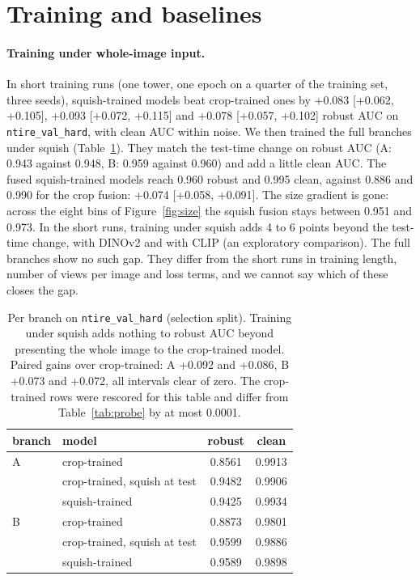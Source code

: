 \documentclass[letterpaper]{article} %
\begin{document}
\section{Training and baselines}
\label{sec:training}

\paragraph{Training under whole-image input.} In short training runs (one tower,
one epoch on a quarter of the training set, three seeds), squish-trained
models beat crop-trained ones by +0.083 [+0.062, +0.105], +0.093 [+0.072,
+0.115] and +0.078 [+0.057, +0.102] robust AUC on \texttt{ntire\_val\_hard},
with clean AUC within noise. We then trained the full branches under squish
(Table~\ref{tab:branches}). They match the test-time change on robust AUC (A:
0.943 against 0.948, B: 0.959 against 0.960) and add a little clean AUC. The
fused squish-trained models reach 0.960 robust and 0.995 clean, against 0.886
and 0.990 for the crop fusion: +0.074 [+0.058, +0.091]. The size gradient is
gone: across the eight bins of Figure~\ref{fig:size} the squish fusion stays
between 0.951 and 0.973. In the short runs, training under squish adds 4 to 6
points beyond the test-time change, with DINOv2 and with CLIP (an
exploratory comparison). The full branches show no such gap. They
differ from the short runs in training length, number of views per image and
loss terms, and we cannot say which of these closes the gap.

\begin{table}[t]
\centering
\small
\setlength{\tabcolsep}{4pt}
\begin{tabular}{llcc}
\toprule
branch & model & robust & clean \\
\midrule
A & crop-trained & 0.8561 & 0.9913 \\
  & crop-trained, squish at test & 0.9482 & 0.9906 \\
  & squish-trained & 0.9425 & 0.9934 \\
\midrule
B & crop-trained & 0.8873 & 0.9801 \\
  & crop-trained, squish at test & 0.9599 & 0.9886 \\
  & squish-trained & 0.9589 & 0.9898 \\
\bottomrule
\end{tabular}
\caption{Per branch on \texttt{ntire\_val\_hard} (selection split). Training under
squish adds nothing to robust AUC beyond presenting the whole image to the
crop-trained model. Paired gains over crop-trained: A +0.092 and +0.086, B
+0.073 and +0.072, all intervals clear of zero. The crop-trained rows were
rescored for this table and differ from Table~\ref{tab:probe} by at most
0.0001.}
\label{tab:branches}
\end{table}
\end{document}

